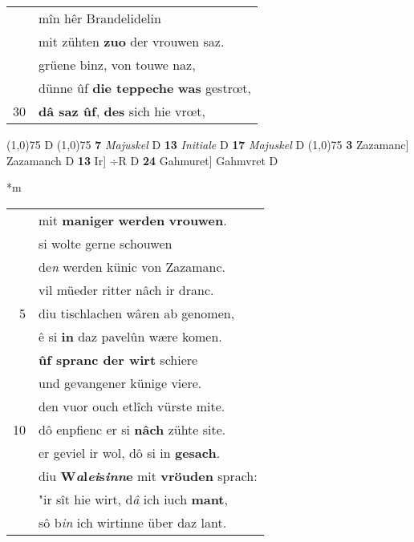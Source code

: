 \documentclass[8pt,a4paper,notitlepage]{article}
\begin{document}
\begin{table}[ht]
\begin{minipage}[t]{0.5\linewidth}
\begin{tabular}{rl}
 & mîn hêr Brandelidelin\\ 
 & mit zühten \textbf{zuo} der vrouwen saz.\\ 
 & grüene binz, von touwe naz,\\ 
 & dünne ûf \textbf{die teppeche} \textbf{was} gestrœt,\\ 
30 & \textbf{dâ saz ûf}, \textbf{des} sich hie vrœt,\\ 
\end{tabular}
\scriptsize
\line(1,0){75} \newline
D \newline
\line(1,0){75} \newline
\textbf{7} \textit{Majuskel} D  \textbf{13} \textit{Initiale} D  \textbf{17} \textit{Majuskel} D  \newline
\line(1,0){75} \newline
\textbf{3} Zazamanc] Zazamanch D \textbf{13} Ir] ÷R D \textbf{24} Gahmuret] Gahmvret D \newline
\end{minipage}
\hspace{0.5cm}
\begin{minipage}[t]{0.5\linewidth}
\small
\begin{center}*m
\end{center}
\begin{tabular}{rl}
 & mit \textbf{maniger} \textbf{werden} \textbf{vrouwen}.\\ 
 & si wolte gerne schouwen\\ 
 & de\textit{n} werden künic von Zazamanc.\\ 
 & vil müeder ritter nâch ir dranc.\\ 
5 & diu tischlachen wâren ab genomen,\\ 
 & ê si \textbf{in} daz pavelûn wære komen.\\ 
 & \textbf{ûf spranc der wirt} schiere\\ 
 & und gevangener künige viere.\\ 
 & den vuor ouch etlîch vürste mite.\\ 
10 & dô enpfienc er si \textbf{nâch} zühte site.\\ 
 & er geviel ir wol, dô si in \textbf{gesach}.\\ 
 & diu \textbf{W\textit{a}l\textit{ei}s\textit{inn}e} mit \textbf{vröuden} sprach:\\ 
 & "ir sît hie wirt, d\textit{â} ich iuch \textbf{mant},\\ 
 & sô b\textit{in} ich wirtinne über daz lant.\\ 

\end{tabular}
\end{minipage}
\end{table}
\end{document}

